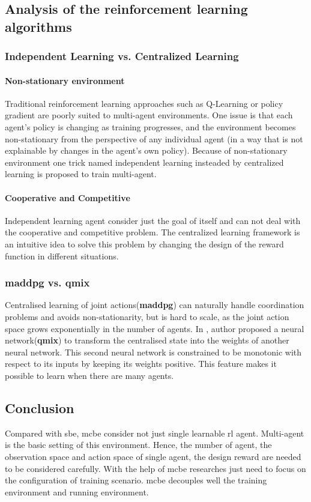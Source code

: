\subsection{Analysis of the reinforcement learning algorithms}
\subsubsection{Independent Learning vs. Centralized Learning}
\paragraph{Non-stationary environment}
Traditional reinforcement learning approaches such as Q-Learning or policy gradient
are poorly suited to multi-agent environments. One issue is that each agent’s policy is changing as training progresses, and the environment becomes non-stationary from the perspective of any individual agent (in a way that is not explainable by changes in the agent’s own policy).
Because of non-stationary environment one trick named independent learning insteaded by centralized learning is proposed to train multi-agent.
\paragraph{Cooperative and Competitive} Independent learning agent consider just the goal of itself and can not deal with the cooperative and competitive problem. The centralized learning framework is an intuitive idea to solve this problem by changing the design of the reward function in different situations.

\subsubsection{\gls{maddpg} vs. \gls{qmix}}
Centralised learning of joint actions(\textbf{\gls{maddpg}}) can naturally handle coordination problems and avoids non-stationarity, but is hard to scale, as the joint action space grows exponentially in the number of agents. In \parencite{Rashid2018}, author proposed a neural network(\textbf{\gls{qmix}}) to transform the centralised state into the weights of another neural network. This second neural network is constrained to be monotonic with respect to its inputs by keeping its weights positive. This feature makes it possible to learn when there are many agents.

\subsection{Conclusion}
Compared with \gls{sbe}, \gls{mcbe} consider not just single learnable \gls{rl} agent. Multi-agent is the basic setting of this environment. Hence, the number of agent, the observation space and action space of single agent, the design reward are needed to be considered carefully. With the help of \gls{mcbe} researches just need to focus on the configuration of training scenario. \gls{mcbe} decouples well the training environment and running environment. 